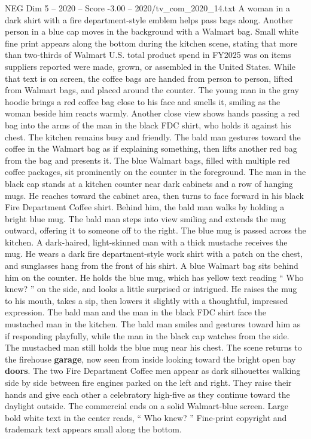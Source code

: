\begin{textsample}{NEG Dim 5 – 2020 – Score -3.00 – 2020/tv\_com\_2020\_14.txt}
A woman in a dark shirt with a fire department-style emblem helps pass bags along.
Another person in a blue cap moves in the background with a Walmart bag.
Small white fine print appears along the bottom during the kitchen scene, stating that more than two-thirds of Walmart U.S. total product spend in FY2025 was on items suppliers reported were made, grown, or assembled in the United States.
While that text is on screen, the coffee bags are handed from person to person, lifted from Walmart bags, and placed around the counter.
The young man in the gray hoodie brings a red coffee bag close to his face and smells it, smiling as the woman beside him reacts warmly.
Another close view shows hands passing a red bag into the arms of the man in the black FDC shirt, who holds it against his chest.
The kitchen remains busy and friendly.
The bald man gestures toward the coffee in the Walmart bag as if explaining something, then lifts another red bag from the bag and presents it.
The blue Walmart bags, filled with multiple red coffee packages, sit prominently on the counter in the foreground.
The man in the black cap stands at a kitchen counter near dark cabinets and a row of hanging mugs.
He reaches toward the cabinet area, then turns to face forward in his black Fire Department Coffee shirt.
Behind him, the bald man walks by holding a bright blue mug.
The bald man steps into view smiling and extends the mug outward, offering it to someone off to the right.
The blue mug is passed across the kitchen.
A dark-haired, light-skinned man with a thick mustache receives the mug.
He wears a dark fire department-style work shirt with a patch on the chest, and sunglasses hang from the front of his shirt.
A blue Walmart bag sits behind him on the counter.
He holds the blue mug, which has yellow text reading “ Who knew? ” on the side, and looks a little surprised or intrigued.
He raises the mug to his mouth, takes a sip, then lowers it slightly with a thoughtful, impressed expression.
The bald man and the man in the black FDC shirt face the mustached man in the kitchen.
The bald man smiles and gestures toward him as if responding playfully, while the man in the black cap watches from the side.
The mustached man still holds the blue mug near his chest.
The scene returns to the firehouse \textbf{garage}, now seen from inside looking toward the bright open bay \textbf{doors}.
The two Fire Department Coffee men appear as dark silhouettes walking side by side between fire engines parked on the left and right.
They raise their hands and give each other a celebratory high-five as they continue toward the daylight outside.
The commercial ends on a solid Walmart-blue screen.
Large bold white text in the center reads, “ Who knew? ” Fine-print copyright and trademark text appears small along the bottom.

\end{textsample}
